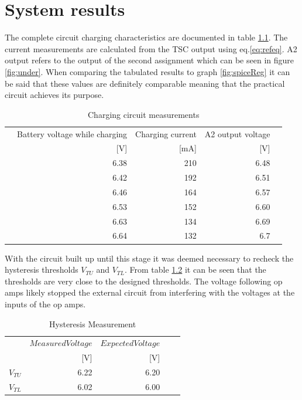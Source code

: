 \chapter{System results}\label{chap:sysres}

\label{sec:sysRes}
The complete circuit charging characteristics are documented in table \ref{tab:batsys}. The current measurements are calculated from the TSC output using eq.\ref{eq:refeq}. A2 output refers to the output of the second assignment which can be seen in figure \ref{fig:under}. When comparing the tabulated results to graph \ref{fig:spiceReg} it can be said that these values are definitely comparable meaning that the practical circuit achieves its purpose.


\begin{table}[!htb]
	\centering
	\footnotesize
	\caption{Charging circuit measurements}
	\begin{tabular}{lrrrr}
		\toprule
		&Battery voltage while charging& Charging current&A2 output voltage \\
		&  [V]&[mA]&[V] \\
		\midrule
		&6.38&210&6.48     \\
		&6.42&192&6.51     \\
		&6.46&164&6.57     \\
		&6.53&152&6.60     \\
		&6.63&134&6.69     \\
		&6.64&132&6.7     \\
		
		
		\bottomrule
	\end{tabular}
	\label{tab:batsys}
\end{table}


With the circuit built up until this stage it was deemed necessary to recheck the hysteresis thresholds $V_{TU}$ and $V_{TL}$. From table \ref{tab:hyst meas} it can be seen that the thresholds are very close to the designed thresholds. The voltage following op amps likely stopped the external circuit from interfering with the voltages at the inputs of the op amps. 
\begin{table}[!htb]
	\centering
	\footnotesize
	\caption{Hysteresis Measurement}
	\begin{tabular}{lrrrr}
		\toprule
		& $MeasuredVoltage$&$ExpectedVoltage$ \\
		&  [V]&  [V] \\
		\midrule
		$V_{TU}$      & 6.22&6.20  \\
		$V_{TL}$     & 6.02&6.00\\
		
		\bottomrule
	\end{tabular}
	\label{tab:hyst meas}
\end{table}



